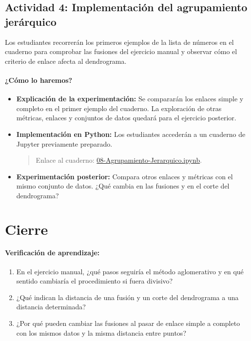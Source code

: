 \documentclass[a4,11pt]{aleph-notas}
\begin{document}
\subsection*{Actividad 4: Implementación del agrupamiento jerárquico}

Los estudiantes recorrerán los primeros ejemplos de la lista de números en el cuaderno para comprobar las fusiones del ejercicio manual y observar cómo el criterio de enlace afecta al dendrograma.

\paragraph{¿Cómo lo haremos?}  
\begin{itemize}[leftmargin=*]
    \item \textbf{Explicación de la experimentación:}  
    Se compararán los enlaces simple y completo en el primer ejemplo del cuaderno. La exploración de otras métricas, enlaces y conjuntos de datos quedará para el ejercicio posterior.
    
    \item \textbf{Implementación en Python:} Los estudiantes accederán a un cuaderno de Jupyter previamente preparado.
    \begin{quote}
        Enlace al cuaderno: \href{https://github.com/andres-merino/AprendizajeAutomaticoInicial-05-N0105/blob/main/2-Notebooks/08-Agrupamiento-Jerarquico.ipynb}{08-Agrupamiento-Jerarquico.ipynb}.
    \end{quote}
    
    \item \textbf{Experimentación posterior:} Compara otros enlaces y métricas con el mismo conjunto de datos. ¿Qué cambia en las fusiones y en el corte del dendrograma?
    
\end{itemize}

\section*{Cierre}

\paragraph{Verificación de aprendizaje:} 
\begin{enumerate}[leftmargin=*]
    \item En el ejercicio manual, ¿qué pasos seguiría el método aglomerativo y en qué sentido cambiaría el procedimiento si fuera divisivo?
    
    \item ¿Qué indican la distancia de una fusión y un corte del dendrograma a una distancia determinada?
    
    \item ¿Por qué pueden cambiar las fusiones al pasar de enlace simple a completo con los mismos datos y la misma distancia entre puntos?
\end{enumerate}
\end{document}
